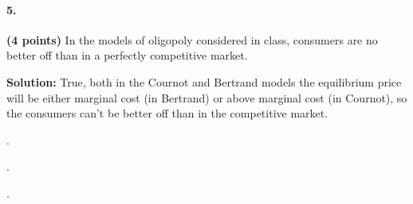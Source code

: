\documentclass[11pt]{article}
\begin{document}
\paragraph{5.} \textbf{(4 points)} In the models of oligopoly considered in class, consumers are no better off than in a perfectly competitive market.

\textbf{Solution:} True, both in the Cournot and Bertrand models the equilibrium price will be either marginal cost (in Bertrand) or above marginal cost (in Cournot), so the consumers can’t be better off than in the competitive market.

.

.

.
\end{document}
